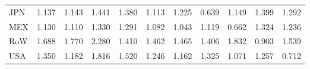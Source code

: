 \begin{table}[htbp]
\begin{tabular}{lcccccccccc}
  JPN & \textcolor[RGB]{201,130,54}{1.137} & \textcolor[RGB]{196,127,59}{1.143} & \textcolor[RGB]{102,66,153}{1.441} & \textcolor[RGB]{117,76,138}{1.380} & \textcolor[RGB]{212,137,43}{1.113} & \textcolor[RGB]{171,111,84}{1.225} & \textcolor[RGB]{252,163,3}{0.639} & \textcolor[RGB]{189,122,66}{1.149} & \textcolor[RGB]{112,73,143}{1.399} & \textcolor[RGB]{145,94,110}{1.292} \\ 
  MEX & \textcolor[RGB]{204,132,51}{1.130} & \textcolor[RGB]{214,139,41}{1.110} & \textcolor[RGB]{128,82,128}{1.330} & \textcolor[RGB]{148,96,107}{1.291} & \textcolor[RGB]{222,144,33}{1.082} & \textcolor[RGB]{227,147,28}{1.043} & \textcolor[RGB]{209,135,46}{1.119} & \textcolor[RGB]{250,162,5}{0.662} & \textcolor[RGB]{135,87,120}{1.324} & \textcolor[RGB]{166,107,89}{1.236} \\ 
  RoW & \textcolor[RGB]{54,35,201}{1.688} & \textcolor[RGB]{33,21,222}{1.770} & \textcolor[RGB]{5,3,250}{2.280} & \textcolor[RGB]{107,69,148}{1.410} & \textcolor[RGB]{94,61,161}{1.462} & \textcolor[RGB]{92,59,163}{1.465} & \textcolor[RGB]{110,71,145}{1.406} & \textcolor[RGB]{23,15,232}{1.832} & \textcolor[RGB]{232,150,23}{0.903} & \textcolor[RGB]{79,51,176}{1.539} \\ 
  USA & \textcolor[RGB]{122,79,133}{1.350} & \textcolor[RGB]{178,115,76}{1.182} & \textcolor[RGB]{28,18,227}{1.816} & \textcolor[RGB]{82,53,173}{1.520} & \textcolor[RGB]{163,106,92}{1.246} & \textcolor[RGB]{184,119,71}{1.162} & \textcolor[RGB]{130,84,125}{1.325} & \textcolor[RGB]{224,145,31}{1.071} & \textcolor[RGB]{158,102,97}{1.257} & \textcolor[RGB]{242,157,13}{0.712} \\ 
   \hline
\end{tabular}
\end{table}
